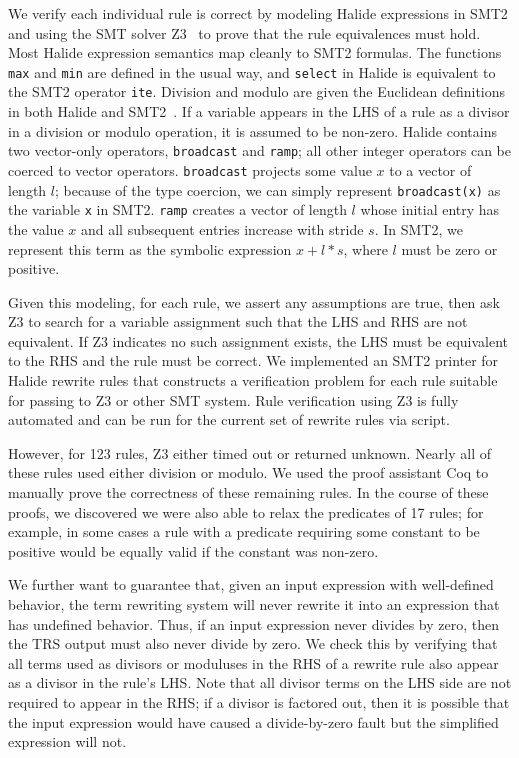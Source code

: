 \documentclass[acmsmall,review,anonymous]{acmart}\settopmatter{printfolios=true,printccs=false,printacmref=false}
\newcommand{\NumPredicatesRelaxed}{{\color{black} 17}\xspace}
\begin{document}
We verify each individual rule is correct by modeling Halide expressions in SMT2
and using the SMT solver Z3~\cite{de2008z3} to prove that the rule equivalences must hold.
Most Halide expression semantics map cleanly
to SMT2 formulas. The functions \texttt{max} and \texttt{min} are defined in
the usual way, and \texttt{select} in Halide is equivalent to the SMT2 operator
\texttt{ite}. Division and modulo are given the Euclidean definitions in both
Halide and SMT2~\cite{boute1992euclidean}. If a variable appears in the LHS of a rule as a divisor in a
division or modulo operation, it is assumed to be non-zero. %
Halide contains two vector-only operators, \texttt{broadcast} and \texttt{ramp}; all
other integer operators can be coerced to vector operators. 
\texttt{broadcast} projects some value $x$ to a vector of length $l$; because of
the type coercion, we can simply represent \texttt{broadcast(x)} as the variable
\texttt{x} in SMT2. \texttt{ramp} creates a vector of length $l$
whose initial entry has the value $x$ and all subsequent entries increase with
stride $s$. In SMT2, we represent this term as the symbolic expression $x + l *
s$, where $l$ must be zero or positive.

Given this modeling, for each rule, we assert any assumptions are true, then
ask Z3 to search for a variable assignment such that the LHS and RHS are not
equivalent.  If Z3 indicates no such assignment exists, the LHS must be equivalent to
the RHS and the rule must be correct. We implemented an SMT2 printer for 
Halide rewrite rules that constructs a verification problem for each rule
suitable for passing to Z3 or other SMT system.  Rule verification using Z3 is fully automated
and can be run for the current set of rewrite rules via script.

However, for 123
rules, Z3 either timed out or returned unknown. Nearly all of these rules used
either division or modulo. We used the proof assistant Coq to manually prove the correctness of these remaining rules. In the course of these proofs, we discovered we
were also able to relax the predicates of \NumPredicatesRelaxed rules; for example, in some cases a rule
with a predicate requiring some constant to be positive would be equally valid
if the constant was non-zero.

We further want to guarantee that, given an input expression with well-defined
behavior, the term rewriting system will never rewrite it into an expression that has
undefined behavior. Thus, if an input expression never divides by zero, then the
TRS output must also never divide by zero. We check this by
verifying that all terms used as divisors or moduluses in the RHS of a
rewrite rule also appear as a divisor in the rule's LHS. Note that all divisor
terms on the LHS side are not required to appear in the RHS; if a divisor is
factored out, then it is possible that the input expression would have caused a
divide-by-zero fault but the simplified expression will not.
\end{document}
